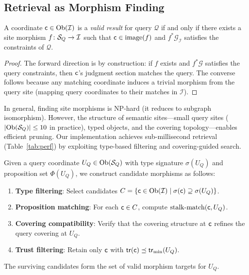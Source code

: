 \documentclass[11pt]{article}
\newcommand{\SemIndex}{\mathcal{I}}
\newcommand{\QuerySheaf}{\mathcal{Q}}
\newcommand{\StalknMatch}{\mathrm{stalk\text{-}match}}
\newcommand{\props}{\Phi}                           %
\newcommand{\tr}{\mathsf{tr}}                        %
\begin{document}
\subsection{Retrieval as Morphism Finding}

\begin{theorem}\label{thm:retrieval-char}
A coordinate $\coord \in \Ob(\SemIndex)$ is a \emph{valid result} for
query $\QuerySheaf$ if and only if there exists a site morphism
$f \colon \Site_Q \to \SemIndex$ such that $\mathsf{c} \in
\mathrm{image}(f)$ and $f^{*}\mathcal{G}_{\SemIndex}$ satisfies the
constraints of $\QuerySheaf$.
\end{theorem}

\begin{proof}
The forward direction is by construction: if $f$ exists and
$f^{*}\mathcal{G}$ satisfies the query constraints, then $\mathsf{c}$'s
judgment section matches the query.  The converse follows because any
matching coordinate induces a trivial morphism from the query site
(mapping query coordinates to their matches in $\SemIndex$).
\end{proof}

\begin{remark}\label{rem:complexity}
In general, finding site morphisms is NP-hard (it reduces to
subgraph isomorphism).  However, the structure of semantic sites---small
query sites ($|\mathrm{Ob}(\mathcal{S}_Q)| \leq 10$ in practice), typed objects, and
the covering topology---enables efficient pruning.  Our implementation
achieves sub-millisecond retrieval (Table~\ref{tab:perf}) by exploiting
type-based filtering and covering-guided search.
\end{remark}

\begin{construction}\label{con:index-morphism}
Given a query coordinate $U_Q \in \mathrm{Ob}(\mathcal{S}_Q)$ with type signature
$\sigma(U_Q)$ and proposition set $\props(U_Q)$, we construct candidate
morphisms as follows:
\begin{enumerate}[noitemsep]
  \item \textbf{Type filtering}: Select candidates
        $C = \{\coord \in \Ob(\SemIndex) \mid
        \sigma(\coord) \supseteq \sigma(U_Q)\}$.
  \item \textbf{Proposition matching}: For each $\mathsf{c} \in C$,
        compute $\StalknMatch(\coord, U_Q)$.
  \item \textbf{Covering compatibility}: Verify that the covering
        structure at $\mathsf{c}$ refines the query covering at $U_Q$.
  \item \textbf{Trust filtering}: Retain only $\mathsf{c}$ with
        $\tr(\coord) \tleq \tr_{\min}(U_Q)$.
\end{enumerate}
The surviving candidates form the set of valid morphism targets for $U_Q$.
\end{construction}
\end{document}
